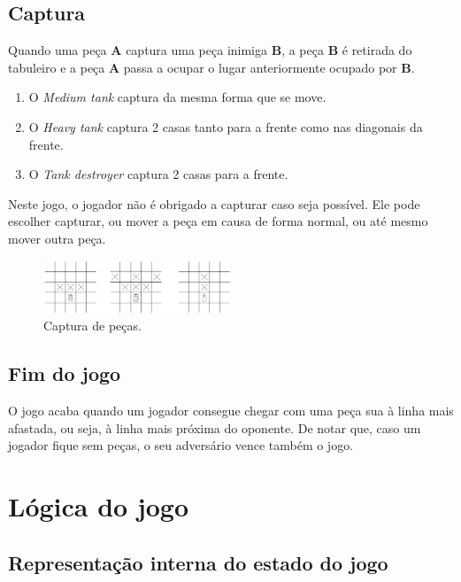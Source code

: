 \documentclass[a4paper,11pt,portuguese]{article}
\begin{document}
\subsection{Captura}
Quando uma peça \textbf{A} captura uma peça inimiga \textbf{B}, a peça \textbf{B} é retirada do tabuleiro
e a peça \textbf{A} passa a ocupar o lugar anteriormente ocupado por \textbf{B}. 

\begin{enumerate}[topsep=4pt,itemsep=2pt]
    \item O \textit{Medium tank} captura da mesma forma que se move.
    \item O \textit{Heavy tank} captura 2 casas tanto para a frente 
    como nas diagonais da frente.
    \item O \textit{Tank destroyer} captura 2 casas para a frente.
\end{enumerate}

\noindent Neste jogo, o jogador não é obrigado a capturar caso seja possível.
Ele pode escolher capturar, ou mover a peça em causa de forma normal, ou até
mesmo mover outra peça.

\begin{figure}[H]
    \centering
    \includegraphics[width=0.5\textwidth]{imgs/capture.png}
    \caption{Captura de peças.}
    \label{fig:capture}
\end{figure}

\subsection{Fim do jogo}

O jogo acaba quando um jogador consegue chegar com uma peça sua à linha mais
afastada, ou seja, à linha mais próxima do oponente.
De notar que, caso um jogador fique sem peças, o seu adversário vence também o jogo.


\section{Lógica do jogo}

    \subsection{Representação interna do estado do jogo}
\end{document}
